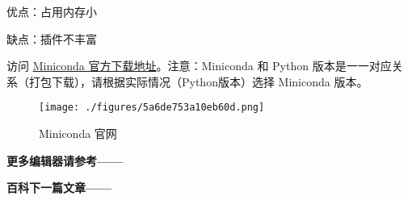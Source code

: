 优点：占用内存小

缺点：插件不丰富

访问 \href{https://docs.conda.io/en/latest/miniconda.html#}{Miniconda 官方下载地址}。注意：Miniconda 和 Python 版本是一一对应关系（打包下载），请根据实际情况（Python版本）选择 Miniconda 版本。

\begin{figure}[ht]
\centering
\texttt{[image: ./figures/5a6de753a10eb60d.png]}
\caption{Miniconda 官网} \label{fig_PyIDE_3}
\end{figure}

\textbf{更多编辑器请参考——}


\textbf{百科下一篇文章——}
